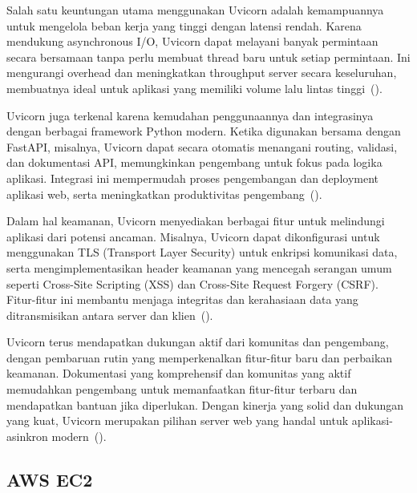 Salah satu keuntungan utama menggunakan Uvicorn adalah kemampuannya untuk mengelola beban kerja yang tinggi dengan latensi rendah. Karena mendukung asynchronous I/O, Uvicorn dapat melayani banyak permintaan secara bersamaan tanpa perlu membuat thread baru untuk setiap permintaan. Ini mengurangi overhead dan meningkatkan throughput server secara keseluruhan, membuatnya ideal untuk aplikasi yang memiliki volume lalu lintas tinggi~(\cite{skjerven2022}).

Uvicorn juga terkenal karena kemudahan penggunaannya dan integrasinya dengan berbagai framework Python modern. Ketika digunakan bersama dengan FastAPI, misalnya, Uvicorn dapat secara otomatis menangani routing, validasi, dan dokumentasi API, memungkinkan pengembang untuk fokus pada logika aplikasi. Integrasi ini mempermudah proses pengembangan dan deployment aplikasi web, serta meningkatkan produktivitas pengembang~(\cite{hwang2021}).

Dalam hal keamanan, Uvicorn menyediakan berbagai fitur untuk melindungi aplikasi dari potensi ancaman. Misalnya, Uvicorn dapat dikonfigurasi untuk menggunakan TLS (Transport Layer Security) untuk enkripsi komunikasi data, serta mengimplementasikan header keamanan yang mencegah serangan umum seperti Cross-Site Scripting (XSS) dan Cross-Site Request Forgery (CSRF). Fitur-fitur ini membantu menjaga integritas dan kerahasiaan data yang ditransmisikan antara server dan klien~(\cite{nguyen2022}).

Uvicorn terus mendapatkan dukungan aktif dari komunitas dan pengembang, dengan pembaruan rutin yang memperkenalkan fitur-fitur baru dan perbaikan keamanan. Dokumentasi yang komprehensif dan komunitas yang aktif memudahkan pengembang untuk memanfaatkan fitur-fitur terbaru dan mendapatkan bantuan jika diperlukan. Dengan kinerja yang solid dan dukungan yang kuat, Uvicorn merupakan pilihan server web yang handal untuk aplikasi-asinkron modern~(\cite{smith2023}). 

\subsection{AWS EC2}

